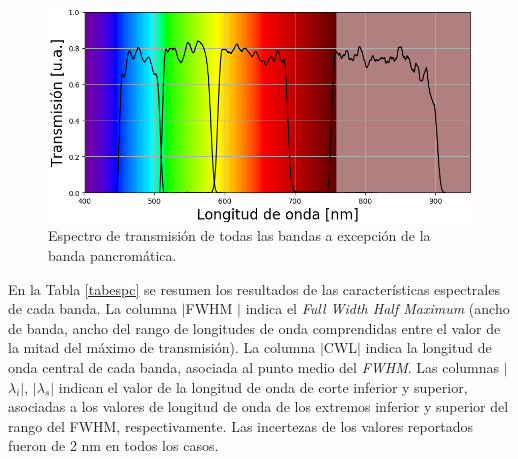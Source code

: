  \begin{figure}[H]
	\centering
	\includegraphics[scale=0.8]{Figs/microespectrometro/4bandas_conimshowT.png}
	\caption{Espectro de transmisión de todas las bandas a excepción de la banda pancromática.}
	\label{fig:batod}
\end{figure}

En la Tabla \ref{tabespc} se resumen los resultados de las características espectrales de cada banda. La columna  $|$FWHM $|$ indica el \textit{Full Width Half Maximum} (ancho de banda, ancho del rango de longitudes de onda comprendidas entre el valor de la mitad del máximo de transmisión). La columna $|$CWL$|$ indica la longitud de onda central de cada banda, asociada al punto medio del \textit{FWHM}. Las columnas $|$$\lambda_{i}$$|$, $|$$\lambda_{s}$$|$ indican el valor de la longitud de onda de corte inferior y superior, asociadas a los valores de longitud de onda de los extremos inferior y superior del rango del FWHM, respectivamente. Las incertezas de los valores reportados fueron de 2 nm en todos los casos.

